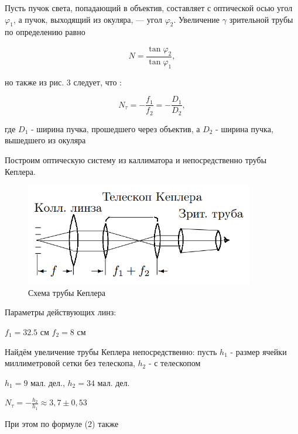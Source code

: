\documentclass[15pt,a5paper,reqno]{article}
\begin{document}
Пусть пучок света, попадающий в объектив, составляет с оптической осью угол $\varphi_1$, а пучок, выходящий из окуляра, — угол $\varphi_2$. Увеличение $\gamma$ зрительной трубы по определению равно

\begin{equation}
    N = \frac{\tan \varphi_2}{\tan \varphi_1},
\end{equation}

но также из рис. 3 следует, что :

\begin{equation}
    N_{\tau} = -\frac{f_1}{f_2} = -\frac{D_1}{D_2},
\end{equation}

где $D_1$ - ширина пучка, прошедшего через объектив, а $D_2$ - ширина пучка, вышедшего из окуляра

Построим оптическую систему из каллиматора и непосредственно трубы Кеплера. 

\begin{figure}[h!]
        \centering
            \includegraphics[width=10cm]{pics/kepler_2.png}
            \caption{Схема трубы Кеплера}
        \label{}
\end{figure}

Параметры действующих линз:

\begin{center}
    $f_{1} = 32.5$ см \hspace{1cm} $f_2 = 8$ см
\end{center}

Найдём увеличение трубы Кеплера непосредственно: пусть $h_1$ - размер ячейки миллиметровой сетки без телескопа, $h_2$ - с телескопом

\begin{center}
	$h_1 = 9$ мал. дел., \hspace{1cm} $h_2 = 34$ мал. дел. \par

	$N_{\tau} = -\frac{h_2}{h_1} \approx 3,7 \pm 0,53$
\end{center}

При этом по формуле (2) также
\end{document}
